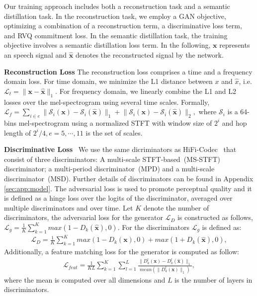 Our training approach includes both a reconstruction task and a semantic distillation task. In the reconstruction task, we employ a GAN objective, optimizing a combination of a reconstruction term, a discriminative loss term, and RVQ commitment loss.  In the semantic distillation task, the training objective involves a semantic distillation loss term. In the following, $\mathbf{x}$ represents an speech signal and $\mathbf{\hat{x}}$ denotes the reconstructed signal by the network.%

\textbf{Reconstruction Loss} The reconstruction loss comprises a time and a frequency domain loss. For time domain, we minimize the L1 distance between $x$ and $\hat{x}$, i.e. 
$\mathcal{L}_t=\lVert \mathbf{x}-\mathbf{\hat{x}}\rVert_1.$
For frequency domain, we linearly combine the L1 and L2 losses over the mel-spectrogram using several time scales. Formally, 
$
\mathcal{L}_{f}=\sum_{i\in e}\lVert \mathcal{S}_i(\mathbf{x})-\mathcal{S}_i(\mathbf{\hat{x}})\rVert_1+\lVert \mathcal{S}_i(\mathbf{x})-\mathcal{S}_i(\mathbf{\hat{x}})\rVert_2,
$
where $\mathcal{S}_i$ is a 64-bins mel-spectrogram using a normalized STFT with window size of $2^i$ and hop length of
$2^i/4,e=5,\cdots,11$ is the set of scales.

\textbf{Discriminative Loss}~ We use the same dicriminators as HiFi-Codec~\cite{yang2023hificodec} that consist of three discriminators: A multi-scale STFT-based~(MS-STFT) discriminator; a multi-period discriminator~(MPD) and a multi-scale discriminator~(MSD). Further details of discriminators can be found in Appendix \ref{sec:app:model}. The adversarial loss is used to promote perceptual quality and it is defined as a hinge loss over the logits of the discriminator, averaged over multiple discriminators and over
time. Let $K$ denote the number of discriminators, the adversarial loss for the generator $\mathcal{L}_{D}$ is constructed as follows, $\mathcal{L}_{g}=\frac{1}{K}\sum_{k=1}^Kmax(1-D_k(\mathbf{\hat{x}}),0).$ For the discriminators $\mathcal{L}_{g}$ is defined as:
\begin{align*}
\mathcal{L}_{D}=\frac{1}{K}\sum_{k=1}^Kmax(1-D_k(\mathbf{x}), 0)+max(1+D_k(\mathbf{\hat{x}}),0),
\end{align*}
Additionally, a feature matching loss for the generator is computed as follow:
\begin{align*}
\mathcal{L}_{feat}=\frac{1}{KL}\sum_{k=1}^K\sum_{l=1}^L
\frac{\lVert D_k^l(\mathbf{x})-D^l_k(\mathbf{\hat{x}})\rVert_1}{mean(\lVert D_k^l(\mathbf{x})\rVert_1)},
\end{align*}
where the mean is computed over all dimensions and $L$ is the number of layers in discriminators.

